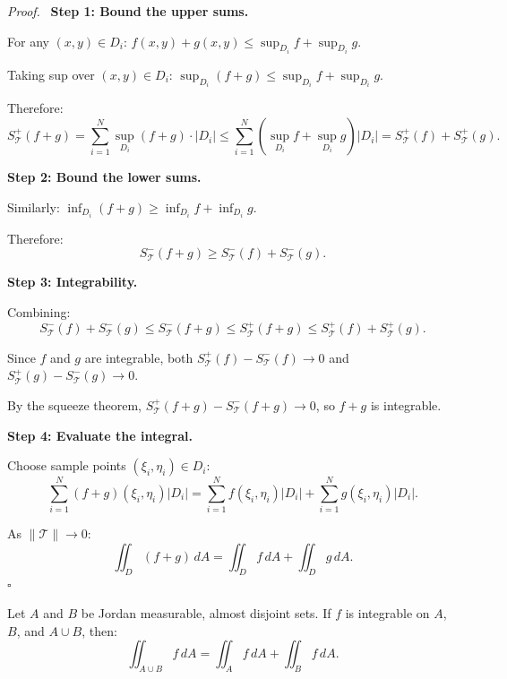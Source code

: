 \documentclass[11pt]{report}
\renewenvironment{proof}[1][Proof]{\par\noindent\textit{#1.}\ }{\hfill$\square$\par\medskip}
\begin{document}
\begin{proof}
\textbf{Step 1: Bound the upper sums.}

For any $(x, y) \in D_i$: $f(x,y) + g(x,y) \leq \sup_{D_i} f + \sup_{D_i} g$.

Taking sup over $(x, y) \in D_i$: $\sup_{D_i}(f + g) \leq \sup_{D_i} f + \sup_{D_i} g$.

Therefore:
\[
S_{\mathcal{T}}^+(f + g) = \sum_{i=1}^{N} \sup_{D_i}(f + g) \cdot |D_i| \leq \sum_{i=1}^{N} \left( \sup_{D_i} f + \sup_{D_i} g \right) |D_i| = S_{\mathcal{T}}^+(f) + S_{\mathcal{T}}^+(g).
\]

\textbf{Step 2: Bound the lower sums.}

Similarly: $\inf_{D_i}(f + g) \geq \inf_{D_i} f + \inf_{D_i} g$.

Therefore:
\[
S_{\mathcal{T}}^-(f + g) \geq S_{\mathcal{T}}^-(f) + S_{\mathcal{T}}^-(g).
\]

\textbf{Step 3: Integrability.}

Combining:
\[
S_{\mathcal{T}}^-(f) + S_{\mathcal{T}}^-(g) \leq S_{\mathcal{T}}^-(f + g) \leq S_{\mathcal{T}}^+(f + g) \leq S_{\mathcal{T}}^+(f) + S_{\mathcal{T}}^+(g).
\]

Since $f$ and $g$ are integrable, both $S_{\mathcal{T}}^+(f) - S_{\mathcal{T}}^-(f) \to 0$ and $S_{\mathcal{T}}^+(g) - S_{\mathcal{T}}^-(g) \to 0$.

By the squeeze theorem, $S_{\mathcal{T}}^+(f+g) - S_{\mathcal{T}}^-(f+g) \to 0$, so $f + g$ is integrable.

\textbf{Step 4: Evaluate the integral.}

Choose sample points $(\xi_i, \eta_i) \in D_i$:
\[
\sum_{i=1}^{N} (f + g)(\xi_i, \eta_i) |D_i| = \sum_{i=1}^{N} f(\xi_i, \eta_i) |D_i| + \sum_{i=1}^{N} g(\xi_i, \eta_i) |D_i|.
\]

As $\|\mathcal{T}\| \to 0$:
\[
\iint_D (f + g) \, dA = \iint_D f \, dA + \iint_D g \, dA.
\]
\end{proof}

\begin{theorem}
Let $A$ and $B$ be Jordan measurable, almost disjoint sets. If $f$ is integrable on $A$, $B$, and $A \cup B$, then:
\[
\iint_{A \cup B} f \, dA = \iint_A f \, dA + \iint_B f \, dA.
\]
\end{theorem}
\end{document}
